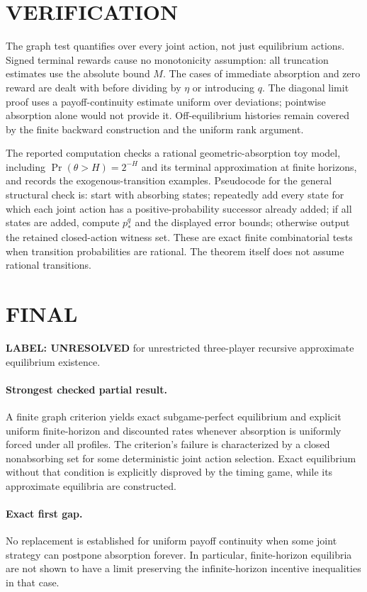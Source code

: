\documentclass[11pt,a4paper]{article}
\theoremstyle{definition}
\theoremstyle{remark}
\begin{document}
\section{VERIFICATION}
The graph test quantifies over every joint action, not just equilibrium actions. Signed terminal rewards cause no monotonicity assumption: all truncation estimates use the absolute bound $M$. The cases of immediate absorption and zero reward are dealt with before dividing by $\eta$ or introducing $q$. The diagonal limit proof uses a payoff-continuity estimate uniform over deviations; pointwise absorption alone would not provide it. Off-equilibrium histories remain covered by the finite backward construction and the uniform rank argument.

The reported computation checks a rational geometric-absorption toy model, including $\Pr(\theta>H)=2^{-H}$ and its terminal approximation at finite horizons, and records the exogenous-transition examples. Pseudocode for the general structural check is: start with absorbing states; repeatedly add every state for which each joint action has a positive-probability successor already added; if all states are added, compute $p_*^q$ and the displayed error bounds; otherwise output the retained closed-action witness set. These are exact finite combinatorial tests when transition probabilities are rational. The theorem itself does not assume rational transitions.

\section{FINAL}
\textbf{LABEL: UNRESOLVED} for unrestricted three-player recursive approximate equilibrium existence.

\paragraph{Strongest checked partial result.}
A finite graph criterion yields exact subgame-perfect equilibrium and explicit uniform finite-horizon and discounted rates whenever absorption is uniformly forced under all profiles. The criterion's failure is characterized by a closed nonabsorbing set for some deterministic joint action selection. Exact equilibrium without that condition is explicitly disproved by the timing game, while its approximate equilibria are constructed.

\paragraph{Exact first gap.}
No replacement is established for uniform payoff continuity when some joint strategy can postpone absorption forever. In particular, finite-horizon equilibria are not shown to have a limit preserving the infinite-horizon incentive inequalities in that case.
\end{document}
